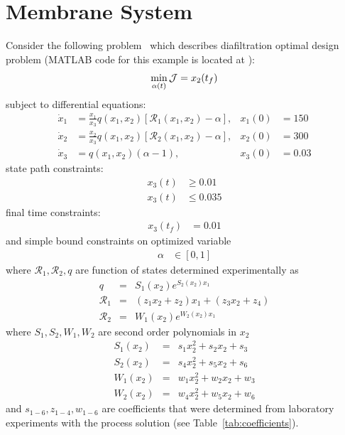 \section{Membrane System}
\label{sec:prob7}

Consider the following problem~\citep{fik10jms} which describes
diafiltration optimal design problem (MATLAB code for this example is located at
):
\begin{equation}
  \min_{\alpha(t)} \mathcal{J} = x_2(t_f)
\end{equation}
subject to differential equations:
\begin{align}
  \dot{x}_1 & = \frac{x_1}{ x_3}
q(x_1, x_2)\left[\mathcal{R}_1(x_1, x_2)-\alpha \right], &
 x_1(0) &= 150  \\
\dot{x}_2 & = \frac{x_2}{ x_3}
q(x_1, x_2)\left[\mathcal{R}_2(x_1, x_2)-\alpha\right], &
 x_2(0) &= 300 \\
\dot{x}_3 &= q(x_1, x_2)(\alpha - 1), &
x_3(0) &= 0.03 
\end{align}
state path constraints:
\begin{align}
  x_3(t) &\ge 0.01 \\
  x_3(t) &\le 0.035
\end{align}
final time constraints:
\begin{align}
  x_3(t_f) &= 0.01 
\end{align}
and simple bound constraints on optimized variable
\begin{align}
  \alpha &\in [0, 1] 
\end{align}
where $\mathcal{R}_1, \mathcal{R}_2, q$ are function of states
determined experimentally as 
\begin{eqnarray} 
q &=& S_1(x_2) e^{S_2(x_2) x_1} \label{eq:Jempiric} \\
\mathcal{R}_1 &=& (z_1 x_2+z_2) x_1  +  ( z_3 x_2+z_4) \label{eq:R1empiric} \\
\mathcal{R}_2 &=& W_1(x_2) e^{W_2(x_2) x_1}	\label{eq:R2empiric}
\end{eqnarray}
where $S_1, S_2, W_1, W_2$ are second order polynomials in $x_2$
\begin{eqnarray} 
S_1(x_2) &=& s_1 x_2^2 + s_2 x_2+s_3 \\
S_2(x_2) &=& s_4 x_2^2 + s_5 x_2+s_6 \\
W_1(x_2) &=& w_1 x_2^2 + w_2 x_2+w_3 \\
W_2(x_2) &=& w_4 x_2^2 + w_5 x_2+w_6 \label{eq:W}
\end{eqnarray}
and $s_{1-6}, z_{1-4},w_{1-6}$ are coefficients that were determined
from laboratory experiments with the process solution
(see Table~\ref{tab:coefficients}).

